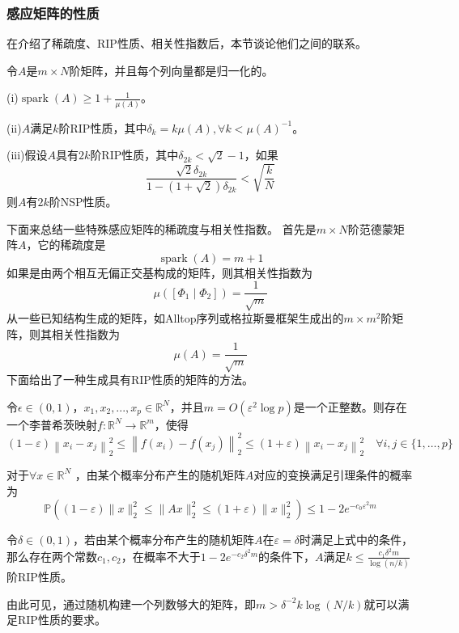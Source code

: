 \subsubsection{感应矩阵的性质}
在介绍了稀疏度、RIP性质、相关性指数后，本节谈论他们之间的联系。
\begin{theorem}
    令$A$是$m\times N$阶矩阵，并且每个列向量都是归一化的。\par
    (i)$\operatorname{spark}(A) \geq 1+\frac{1}{\mu(A)}$。\par
    (ii)$A$满足$k$阶RIP性质，其中$\delta_k=k \mu(A), \forall  k<\mu(A)^{-1}$。\par
    (iii)假设$A$具有$2k$阶RIP性质，其中$\delta_{2 k}<\sqrt{2} -1$，如果
    \begin{equation}
        \frac{\sqrt{2} \delta_{2 k}}{1-(1+\sqrt{2}) \delta_{2 k}}<\sqrt{\frac{k}{N}}
    \end{equation}
    则$A$有$2k$阶NSP性质。
\end{theorem}
下面来总结一些特殊感应矩阵的稀疏度与相关性指数。
首先是$m\times N$阶范德蒙矩阵$A$，它的稀疏度是
\begin{equation}
    \operatorname{spark}(A)=m+1
\end{equation}
如果是由两个相互无偏正交基构成的矩阵，则其相关性指数为
\begin{equation}
    \mu\left(\left[\Phi_1 \mid \Phi_2\right]\right)=\frac{1}{\sqrt{m}}
\end{equation}
从一些已知结构生成的矩阵，如Alltop序列或格拉斯曼框架生成出的$m\times m^2$阶矩阵，则其相关性指数为
\begin{equation}
    \mu(A)=\frac{1}{\sqrt{m}}
\end{equation}
下面给出了一种生成具有RIP性质的矩阵的方法。
\begin{lemma}
    令$\epsilon \in \left( 0,1\right)$，$x_1,x_2,...,x_p\in \mathbb{R}^N$，并且$m=O\left(\varepsilon^2
    \log p\right)$是一个正整数。则存在一个李普希茨映射$f:\mathbb{R}^N \rightarrow \mathbb{R}^m$，使得
    \begin{equation}
        (1-\varepsilon)\left\|x_i-x_j\right\|_2^2 \leq\left\|f\left(x_i\right)-f\left(x_j\right)\right\|_2^2 
        \leq(1+\varepsilon)\left\|x_i-x_j\right\|_2^2 \quad \forall i, j \in\{1, \ldots, p\}
    \end{equation}
\end{lemma}
对于$\forall x \in \mathbb{R}^N$ ，由某个概率分布产生的随机矩阵$A$对应的变换满足引理条件的概率为
\begin{equation}
    \mathbb{P}\left((1-\varepsilon)\|x\|_2^2 \leq\|A x\|_2^2 \leq(1+\varepsilon)\|x\|_2^2\right) \leq 1-2 e^{-c_0 \varepsilon^2 m}
\end{equation}
\begin{theorem}
    令$\delta \in (0,1)$，若由某个概率分布产生的随机矩阵$A$在$\varepsilon =\delta$时满足上式中的条件，
    那么存在两个常数$c_1,c_2$，在概率不大于$1-2 e^{-c_2 \delta^2 m}$的条件下，$A$满足$k \leq  \frac{c_1 \delta^2m}{\log (n / k)}$阶RIP性质。
\end{theorem}
由此可见，通过随机构建一个列数够大的矩阵，即$m>\delta^{-2} k \log (N / k)$就可以满足RIP性质的要求。
